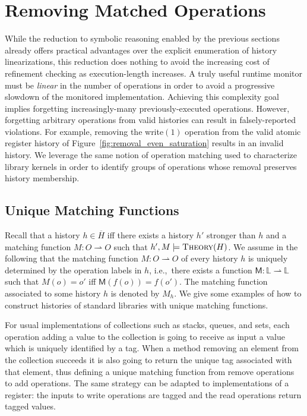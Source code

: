 \section{Removing Matched Operations}
\label{sec:obsolete}

While the reduction to symbolic reasoning enabled by the previous sections
already offers practical advantages over the explicit enumeration of history
linearizations, this reduction does nothing to avoid the increasing cost of
refinement checking as execution-length increases. A truly useful runtime
monitor must be \emph{linear} in the number of operations in order to avoid a
progressive slowdown of the monitored implementation. Achieving this complexity
goal implies forgetting increasingly-many previously-executed operations.
However, forgetting arbitrary operations from valid histories can result in
falsely-reported violations. For example, removing the write$(1)$
operation from the valid atomic register history of
Figure~\ref{fig:removal_even_saturation} results in an invalid history. We
leverage the same notion of operation matching used to characterize library
kernels in order to identify groups of operations whose removal preserves
history membership.

\subsection{Unique Matching Functions}

Recall that a history $h\in \overline{H}$ iff there exists a history $h'$
stronger than $h$ and a matching function $M : O \rightharpoonup O$ such that
$h',M\models \textsc{Theory}(H)$. We assume in the following that the 
matching function $M : O \rightharpoonup O$ of every history $h$ is uniquely determined 
by the operation labels in $h$, i.e.,~there exists a function
$\mathsf{M}:\mathbb{L} \rightharpoonup \mathbb{L}$ such that $M(o)=o'$ iff
$\mathsf{M}(f(o))=f(o')$. The matching function associated to some history $h$
is denoted by $M_h$. We give some examples of how to construct histories of
standard libraries with unique matching functions.

\begin{example}[Collections]

  For usual implementations of collections such as stacks, queues, and sets,
  each operation adding a value to the collection is going to receive as input
  a value which is uniquely identified by a tag. When a method removing an
  element from the collection succeeds it is also going to return the unique
  tag associated with that element, thus defining a unique matching function
  from remove operations to add operations. The same strategy can be adapted to
  implementations of a register: the inputs to write operations are tagged and
  the read operations return tagged values.

\end{example}

